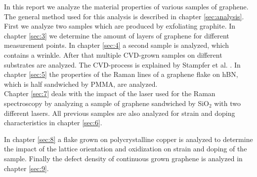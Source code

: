 \documentclass[12pt,a4paper]{article}
\begin{document}
In this report we analyze the material properties of various samples of graphene. The general method used for this analysis is described in chapter \ref{sec:analysis}. First we analyze two samples which are produced by exfoliating graphite. In chapter \ref{sec:3} we determine the amount of layers of graphene for different measurement points. In chapter \ref{sec:4} a second sample is analyzed, which contains a wrinkle.
After that multiple CVD-grown samples on different substrates are analyzed. The CVD-process is explained by Stampfer et al. \cite{Banszeruse}. In chapter \ref{sec:5} the properties of the Raman lines of a graphene flake on hBN, which is half sandwiched by PMMA, are analyzed.\\
Chapter \ref{sec:7} deals with the impact of the laser used for the Raman spectroscopy by analyzing a sample of graphene sandwiched by SiO$_2$ with two different lasers.
All previous samples are also analyzed for strain and doping characteristics in chapter \ref{sec:6}.

In chapter \ref{sec:8} a flake grown on polycrystalline copper is analyzed to determine the impact of the lattice orientation and oxidization on strain and doping of the sample. Finally the defect density of continuous grown graphene is analyzed in chapter \ref{sec:9}.
\end{document}
